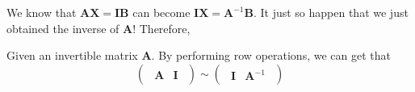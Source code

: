 \documentclass{huhtakm-template-book}
\begin{document}
We know that $\mathbf{AX}=\mathbf{IB}$ can become $\mathbf{IX}=\mathbf{A}^{-1}\mathbf{B}$. It just so happen that we just obtained the inverse of $\mathbf{A}$! Therefore,
\begin{thm}
    Given an invertible matrix $\mathbf{A}$. By performing row operations, we can get that
    \begin{equation*}
        \begin{pmatrix}
            \begin{array}{c|c}
                \mathbf{A} & \mathbf{I}
            \end{array}
        \end{pmatrix}\sim\begin{pmatrix}
            \begin{array}{c|c}
                \mathbf{I} & \mathbf{A}^{-1}
            \end{array}
        \end{pmatrix}
    \end{equation*}
\end{thm}
\end{document}
